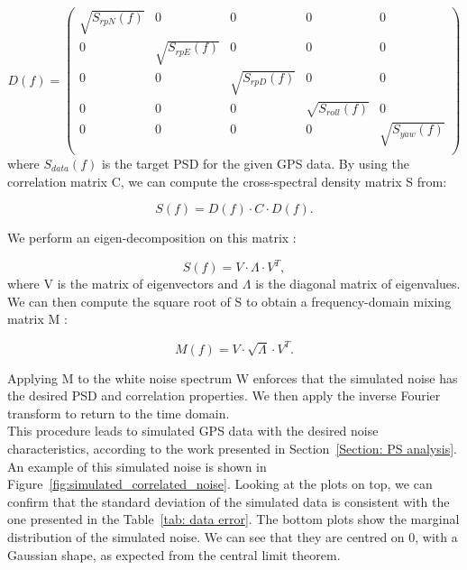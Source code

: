 \documentclass[../../thesis.tex]{subfiles}
\begin{document}
\begin{equation}
    D(f) =
    \begin{pmatrix}
        \sqrt{S_{rpN}(f)} & 0                 & 0                 & 0                  & 0                 \\
        0                 & \sqrt{S_{rpE}(f)} & 0                 & 0                  & 0                 \\
        0                 & 0                 & \sqrt{S_{rpD}(f)} & 0                  & 0                 \\
        0                 & 0                 & 0                 & \sqrt{S_{roll}(f)} & 0                 \\
        0                 & 0                 & 0                 & 0                  & \sqrt{S_{yaw}(f)} \\
    \end{pmatrix}
\end{equation}
where $S_{data}(f)$ is the target PSD for the given GPS data. By using the correlation matrix C, we can compute the cross-spectral density matrix S from:

\begin{equation}
    S(f) = D(f) \cdot C \cdot D(f).
\end{equation}

We perform an eigen-decomposition on this matrix :

\begin{equation}
    S(f) = V \cdot \Lambda \cdot V^T,
\end{equation}
where V is the matrix of eigenvectors and $\Lambda$ is the diagonal matrix of eigenvalues. We can then compute the square root of S to obtain a frequency-domain mixing matrix M :

\begin{equation}
    M(f) = V \cdot \sqrt{\Lambda} \cdot V^T.
\end{equation}

Applying M to the white noise spectrum W enforces that the simulated noise has the desired PSD and correlation properties. We then apply the inverse Fourier transform to return to the time domain. \\
This procedure leads to simulated GPS data with the desired noise characteristics, according to the work presented in Section~\ref{Section: PS analysis}. An example of this simulated noise is shown in Figure~\ref{fig:simulated_correlated_noise}. Looking at the plots on top, we can confirm that the standard deviation of the simulated data is consistent with the one presented in the Table~\ref{tab: data error}. The bottom plots show the marginal distribution of the simulated noise. We can see that they are centred on 0, with a Gaussian shape, as expected from the central limit theorem.
\end{document}

